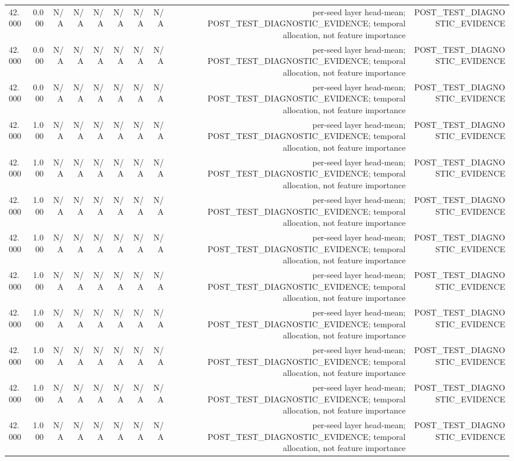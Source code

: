 \begin{table}[h!]
\begin{tabular}{lrrrrrrrrr}
42.000 & 0.000 & N/A & N/A & N/A & N/A & N/A & N/A & per-seed layer head-mean; POST\_TEST\_DIAGNOSTIC\_EVIDENCE; temporal allocation, not feature importance & POST\_TEST\_DIAGNOSTIC\_EVIDENCE \\
42.000 & 0.000 & N/A & N/A & N/A & N/A & N/A & N/A & per-seed layer head-mean; POST\_TEST\_DIAGNOSTIC\_EVIDENCE; temporal allocation, not feature importance & POST\_TEST\_DIAGNOSTIC\_EVIDENCE \\
42.000 & 0.000 & N/A & N/A & N/A & N/A & N/A & N/A & per-seed layer head-mean; POST\_TEST\_DIAGNOSTIC\_EVIDENCE; temporal allocation, not feature importance & POST\_TEST\_DIAGNOSTIC\_EVIDENCE \\
42.000 & 1.000 & N/A & N/A & N/A & N/A & N/A & N/A & per-seed layer head-mean; POST\_TEST\_DIAGNOSTIC\_EVIDENCE; temporal allocation, not feature importance & POST\_TEST\_DIAGNOSTIC\_EVIDENCE \\
42.000 & 1.000 & N/A & N/A & N/A & N/A & N/A & N/A & per-seed layer head-mean; POST\_TEST\_DIAGNOSTIC\_EVIDENCE; temporal allocation, not feature importance & POST\_TEST\_DIAGNOSTIC\_EVIDENCE \\
42.000 & 1.000 & N/A & N/A & N/A & N/A & N/A & N/A & per-seed layer head-mean; POST\_TEST\_DIAGNOSTIC\_EVIDENCE; temporal allocation, not feature importance & POST\_TEST\_DIAGNOSTIC\_EVIDENCE \\
42.000 & 1.000 & N/A & N/A & N/A & N/A & N/A & N/A & per-seed layer head-mean; POST\_TEST\_DIAGNOSTIC\_EVIDENCE; temporal allocation, not feature importance & POST\_TEST\_DIAGNOSTIC\_EVIDENCE \\
42.000 & 1.000 & N/A & N/A & N/A & N/A & N/A & N/A & per-seed layer head-mean; POST\_TEST\_DIAGNOSTIC\_EVIDENCE; temporal allocation, not feature importance & POST\_TEST\_DIAGNOSTIC\_EVIDENCE \\
42.000 & 1.000 & N/A & N/A & N/A & N/A & N/A & N/A & per-seed layer head-mean; POST\_TEST\_DIAGNOSTIC\_EVIDENCE; temporal allocation, not feature importance & POST\_TEST\_DIAGNOSTIC\_EVIDENCE \\
42.000 & 1.000 & N/A & N/A & N/A & N/A & N/A & N/A & per-seed layer head-mean; POST\_TEST\_DIAGNOSTIC\_EVIDENCE; temporal allocation, not feature importance & POST\_TEST\_DIAGNOSTIC\_EVIDENCE \\
42.000 & 1.000 & N/A & N/A & N/A & N/A & N/A & N/A & per-seed layer head-mean; POST\_TEST\_DIAGNOSTIC\_EVIDENCE; temporal allocation, not feature importance & POST\_TEST\_DIAGNOSTIC\_EVIDENCE \\
42.000 & 1.000 & N/A & N/A & N/A & N/A & N/A & N/A & per-seed layer head-mean; POST\_TEST\_DIAGNOSTIC\_EVIDENCE; temporal allocation, not feature importance & POST\_TEST\_DIAGNOSTIC\_EVIDENCE \\

\end{tabular}
\end{table}
